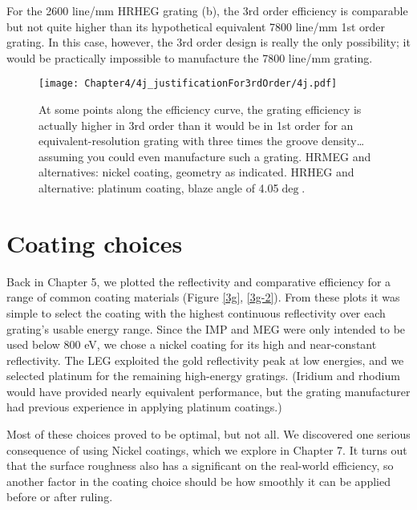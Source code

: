 For the 2600 line/mm HRHEG grating (b), the 3rd order efficiency is comparable but not quite higher than its hypothetical equivalent 7800 line/mm 1st order grating.  In this case, however, the 3rd order design is really the only possibility; it would be practically impossible to manufacture the 7800 line/mm grating.
          
\begin{figure}[htbp] %
   \centering
   \texttt{[image: Chapter4/4j\_justificationFor3rdOrder/4j.pdf]} 
   \caption[Justification for third-order design: At some points along the efficiency curve, the grating efficiency is actually higher in 3rd order than it would be in 1st order for an equivalent-resolution grating with three times the groove density.]{At some points along the efficiency curve, the grating efficiency is actually higher in 3rd order than it would be in 1st order for an equivalent-resolution grating with three times the groove density\ldots assuming you could even manufacture such a grating.  HRMEG and alternatives: nickel coating, geometry as indicated.  HRHEG and alternative: platinum coating, blaze angle of 4.05$\deg$.}
   \label{4e}
\end{figure}

\section{Coating choices}
Back in Chapter 5, we plotted the reflectivity and comparative efficiency for a range of common coating materials (Figure \ref{3g}, \ref{3g-2}).  From these plots it was simple to select the coating with the highest continuous reflectivity over each grating's usable energy range.  Since the IMP and MEG were only intended to be used below 800 eV, we chose a nickel coating for its high and near-constant reflectivity.  The LEG exploited the gold reflectivity peak at low energies, and we selected platinum for the remaining high-energy gratings.  (Iridium and rhodium would have provided nearly equivalent performance, but the grating manufacturer had previous experience in applying platinum coatings.)

Most of these choices proved to be optimal, but not all.  We discovered one serious consequence of using Nickel coatings, which we explore in Chapter 7.  It turns out that the surface roughness also has a significant on the real-world efficiency, so another factor in the coating choice should be how smoothly it can be applied before or after ruling.

